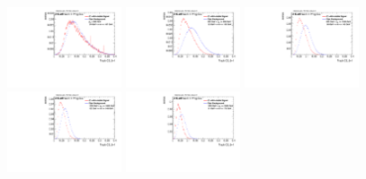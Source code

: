 \begin{figure}[H]
\includegraphics[width=0.3\textwidth]{sascha_input/Appendix/Distributions/higgs/distributions/beta1/h_normal_tj_C2_bin1.pdf} \hspace{1mm}
\includegraphics[width=0.3\textwidth]{sascha_input/Appendix/Distributions/higgs/distributions/beta1/h_normal_tj_C2_bin2.pdf} \hspace{4mm}
\includegraphics[width=0.3\textwidth]{sascha_input/Appendix/Distributions/higgs/distributions/beta1/h_normal_tj_C2_bin3.pdf} 
\bigskip
\includegraphics[width=0.3\textwidth]{sascha_input/Appendix/Distributions/higgs/distributions/beta1/h_normal_tj_C2_bin4.pdf} \hspace{4mm}
\includegraphics[width=0.3\textwidth]{sascha_input/Appendix/Distributions/higgs/distributions/beta1/h_normal_tj_C2_bin5.pdf} 


\end{figure}
